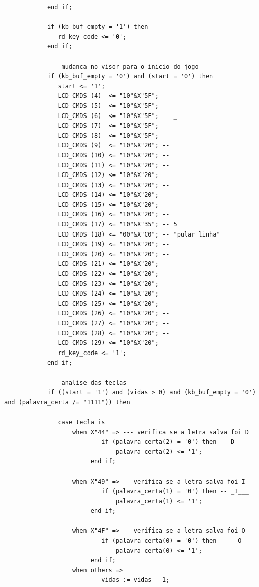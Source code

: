 \documentclass[a4paper,12pt,twoside]{article}
\begin{document}
\begin{lstlisting}
            end if;
			
            if (kb_buf_empty = '1') then
               rd_key_code <= '0';
            end if;
            
			--- mudanca no visor para o inicio do jogo 	
            if (kb_buf_empty = '0') and (start = '0') then
               start <= '1';
               LCD_CMDS (4)  <= "10"&X"5F"; -- _
               LCD_CMDS (5)  <= "10"&X"5F"; -- _
               LCD_CMDS (6)  <= "10"&X"5F"; -- _
               LCD_CMDS (7)  <= "10"&X"5F"; -- _
               LCD_CMDS (8)  <= "10"&X"5F"; -- _
               LCD_CMDS (9)  <= "10"&X"20"; --
               LCD_CMDS (10) <= "10"&X"20"; --
               LCD_CMDS (11) <= "10"&X"20"; --
               LCD_CMDS (12) <= "10"&X"20"; --
               LCD_CMDS (13) <= "10"&X"20"; --
               LCD_CMDS (14) <= "10"&X"20"; --
               LCD_CMDS (15) <= "10"&X"20"; --
               LCD_CMDS (16) <= "10"&X"20"; --
               LCD_CMDS (17) <= "10"&X"35"; -- 5
               LCD_CMDS (18) <= "00"&X"C0"; -- "pular linha" 
               LCD_CMDS (19) <= "10"&X"20"; --  
               LCD_CMDS (20) <= "10"&X"20"; -- 
               LCD_CMDS (21) <= "10"&X"20"; -- 
               LCD_CMDS (22) <= "10"&X"20"; -- 
               LCD_CMDS (23) <= "10"&X"20"; -- 
               LCD_CMDS (24) <= "10"&X"20"; -- 
               LCD_CMDS (25) <= "10"&X"20"; -- 
               LCD_CMDS (26) <= "10"&X"20"; -- 
               LCD_CMDS (27) <= "10"&X"20"; -- 
               LCD_CMDS (28) <= "10"&X"20"; -- 
               LCD_CMDS (29) <= "10"&X"20"; -- 	
               rd_key_code <= '1';
            end if;
			
            --- analise das teclas
            if ((start = '1') and (vidas > 0) and (kb_buf_empty = '0') and (palavra_certa /= "1111")) then 
               
               case tecla is
                   when X"44" => --- verifica se a letra salva foi D
                           if (palavra_certa(2) = '0') then -- D____
                               palavra_certa(2) <= '1';
						end if;
					
                   when X"49" => -- verifica se a letra salva foi I
                           if (palavra_certa(1) = '0') then -- _I___
                               palavra_certa(1) <= '1';
						end if;
					
                   when X"4F" => -- verifica se a letra salva foi O
                           if (palavra_certa(0) = '0') then -- __O__
                               palavra_certa(0) <= '1';
						end if;
                   when others =>
                           vidas := vidas - 1;
					

\end{lstlisting}
\end{document}

